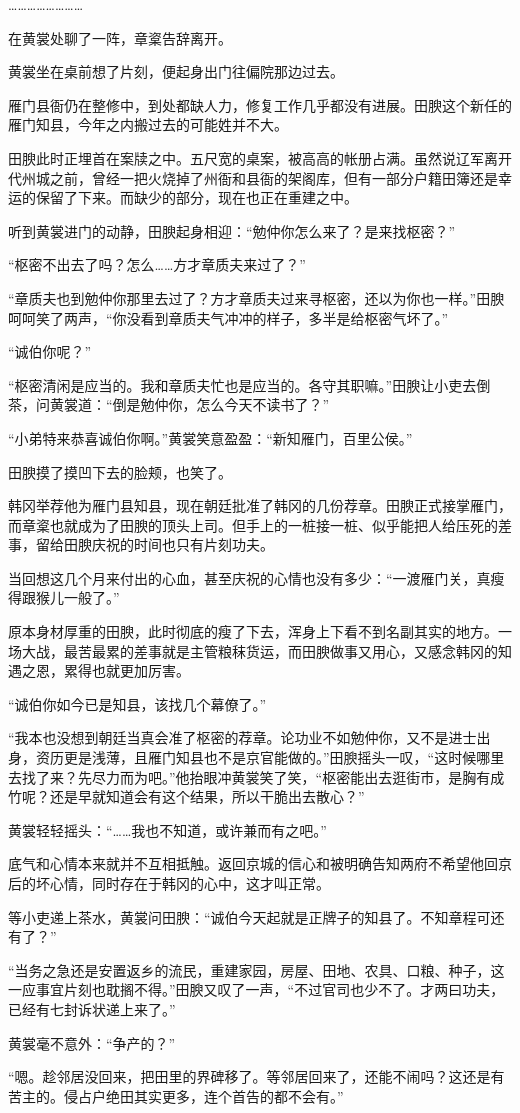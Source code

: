 ……………………

在黄裳处聊了一阵，章楶告辞离开。

黄裳坐在桌前想了片刻，便起身出门往偏院那边过去。

雁门县衙仍在整修中，到处都缺人力，修复工作几乎都没有进展。田腴这个新任的雁门知县，今年之内搬过去的可能姓并不大。

田腴此时正埋首在案牍之中。五尺宽的桌案，被高高的帐册占满。虽然说辽军离开代州城之前，曾经一把火烧掉了州衙和县衙的架阁库，但有一部分户籍田簿还是幸运的保留了下来。而缺少的部分，现在也正在重建之中。

听到黄裳进门的动静，田腴起身相迎：“勉仲你怎么来了？是来找枢密？”

“枢密不出去了吗？怎么……方才章质夫来过了？”

“章质夫也到勉仲你那里去过了？方才章质夫过来寻枢密，还以为你也一样。”田腴呵呵笑了两声，“你没看到章质夫气冲冲的样子，多半是给枢密气坏了。”

“诚伯你呢？”

“枢密清闲是应当的。我和章质夫忙也是应当的。各守其职嘛。”田腴让小吏去倒茶，问黄裳道：“倒是勉仲你，怎么今天不读书了？”

“小弟特来恭喜诚伯你啊。”黄裳笑意盈盈：“新知雁门，百里公侯。”

田腴摸了摸凹下去的脸颊，也笑了。

韩冈举荐他为雁门县知县，现在朝廷批准了韩冈的几份荐章。田腴正式接掌雁门，而章楶也就成为了田腴的顶头上司。但手上的一桩接一桩、似乎能把人给压死的差事，留给田腴庆祝的时间也只有片刻功夫。

当回想这几个月来付出的心血，甚至庆祝的心情也没有多少：“一渡雁门关，真瘦得跟猴儿一般了。”

原本身材厚重的田腴，此时彻底的瘦了下去，浑身上下看不到名副其实的地方。一场大战，最苦最累的差事就是主管粮秣货运，而田腴做事又用心，又感念韩冈的知遇之恩，累得也就更加厉害。

“诚伯你如今已是知县，该找几个幕僚了。”

“我本也没想到朝廷当真会准了枢密的荐章。论功业不如勉仲你，又不是进士出身，资历更是浅薄，且雁门知县也不是京官能做的。”田腴摇头一叹，“这时候哪里去找了来？先尽力而为吧。”他抬眼冲黄裳笑了笑，“枢密能出去逛街市，是胸有成竹呢？还是早就知道会有这个结果，所以干脆出去散心？”

黄裳轻轻摇头：“……我也不知道，或许兼而有之吧。”

底气和心情本来就并不互相抵触。返回京城的信心和被明确告知两府不希望他回京后的坏心情，同时存在于韩冈的心中，这才叫正常。

等小吏递上茶水，黄裳问田腴：“诚伯今天起就是正牌子的知县了。不知章程可还有了？”

“当务之急还是安置返乡的流民，重建家园，房屋、田地、农具、口粮、种子，这一应事宜片刻也耽搁不得。”田腴又叹了一声，“不过官司也少不了。才两曰功夫，已经有七封诉状递上来了。”

黄裳毫不意外：“争产的？”

“嗯。趁邻居没回来，把田里的界碑移了。等邻居回来了，还能不闹吗？这还是有苦主的。侵占户绝田其实更多，连个首告的都不会有。”
